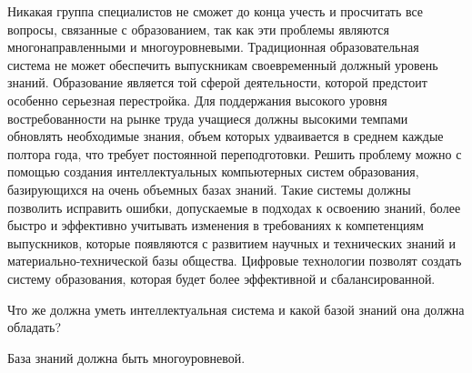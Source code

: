 Никакая группа специалистов не сможет до конца учесть и просчитать все вопросы, связанные с образованием, так как эти проблемы являются многонаправленными и многоуровневыми. Традиционная образовательная система не может обеспечить выпускникам своевременный должный уровень знаний. Образование является той сферой деятельности, которой предстоит особенно серьезная перестройка. Для поддержания высокого уровня востребованности на рынке труда учащиеся должны высокими темпами обновлять необходимые знания, объем которых удваивается в среднем каждые полтора года, что требует постоянной переподготовки. Решить проблему можно с помощью создания интеллектуальных компьютерных систем образования, базирующихся на очень объемных базах знаний. Такие системы должны позволить исправить ошибки, допускаемые в подходах к освоению знаний, более быстро и эффективно учитывать изменения в требованиях к компетенциям выпускников, которые появляются с развитием научных и технических знаний и материально-технической базы общества. Цифровые технологии позволят создать систему образования, которая будет более эффективной и сбалансированной. 

Что же должна уметь интеллектуальная система и какой базой знаний она должна обладать?

База знаний должна быть многоуровневой.

